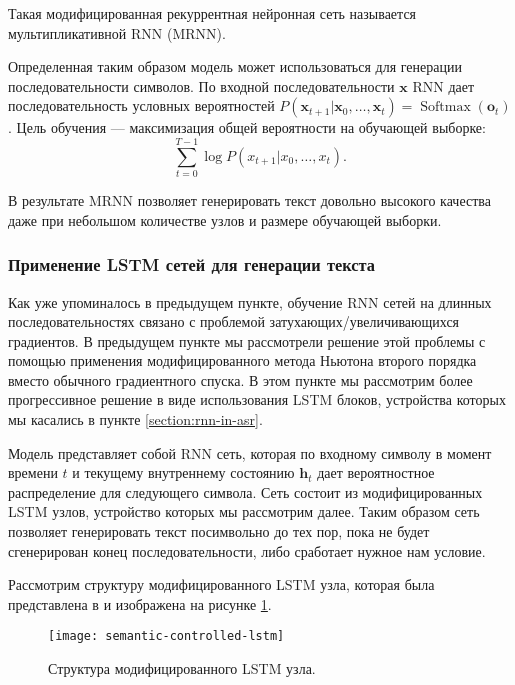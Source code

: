 Такая модифицированная рекуррентная нейронная сеть называется мультипликативной RNN (MRNN)\cite{sutskever2011generating}.

Определенная таким образом модель может использоваться для генерации последовательности символов. По входной последовательности $\mathbf{x}$ RNN дает последовательность условных вероятностей $P(\mathbf{x}_{t + 1}|\mathbf{x}_0, \dots, \mathbf{x}_t) = \operatorname{Softmax}(\mathbf{o}_t)$. Цель обучения --- максимизация общей вероятности на обучающей выборке:
$$\sum_{t = 0}^{T - 1} \log P(x_{t + 1}| x_0, \dots, x_t).$$

В результате MRNN позволяет генерировать текст довольно высокого качества даже при небольшом количестве узлов и размере обучающей выборки.

\subsubsection{Применение LSTM сетей для генерации текста}
Как уже упоминалось в предыдущем пункте, обучение RNN сетей на длинных последовательностях связано с проблемой затухающих/увеличивающихся градиентов. В предыдущем пункте мы рассмотрели решение этой проблемы с помощью применения модифицированного метода Ньютона второго порядка вместо обычного градиентного спуска. В этом пункте мы рассмотрим более прогрессивное решение в виде использования LSTM блоков, устройства которых мы касались в пункте \ref{section:rnn-in-asr}.

Модель представляет собой RNN сеть, которая по входному символу в момент времени $t$ и текущему внутреннему состоянию $\mathbf{h}_t$ дает вероятностное распределение для следующего символа. Сеть состоит из модифицированных LSTM узлов, устройство которых мы рассмотрим далее. Таким образом сеть позволяет генерировать текст посимвольно до тех пор, пока не будет сгенерирован конец последовательности, либо сработает нужное нам условие.

Рассмотрим структуру модифицированного LSTM узла, которая была представлена в \cite{wen2015semantically} и изображена на рисунке \ref{fig:semantic-controlled-lstm}.
\begin{figure}[h]
	\centering
	\texttt{[image: semantic-controlled-lstm]}
	\caption{Структура модифицированного LSTM узла.}
	\label{fig:semantic-controlled-lstm}
\end{figure}

